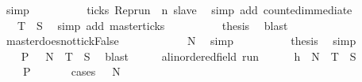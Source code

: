 \begin{isabellebody}
\ simp\isanewline
\ \ \ \ \ \ \ \ \isamarkupfalse%
\ {\isacartoucheopen}ticks\ {\isacharparenleft}Rep{\isacharunderscore}run\ {\isasymrho}\ n\ slave{\isacharparenright}{\isacartoucheclose}\ \isamarkupfalse%
\ {\isacharparenleft}simp\ add{\isacharcolon}\ counted{\isacharunderscore}immediate{\isacharparenright}\isanewline
\ \ \ \ \ \ \ \ \isamarkupfalse%
\ {\isacartoucheopen}{\isasymrho}\ {\isasymin}\ {\isacharquery}T\ {\isasyminter}\ {\isacharquery}S{\isacartoucheclose}\ \isamarkupfalse%
\ {\isacharparenleft}simp\ add{\isacharcolon}\ master{\isacharunderscore}ticks{\isacharparenright}\isanewline
\ \ \ \ \ \ \ \ \isamarkupfalse%
\ {\isacharquery}thesis\ \isamarkupfalse%
\ blast\isanewline
\ \ \ \ \isamarkupfalse%
\isanewline
\ \ \ \ \ \ \isamarkupfalse%
\ master{\isacharunderscore}doesnot{\isacharunderscore}tick{\isacharcolon}False\isanewline
\ \ \ \ \ \ \ \ \isamarkupfalse%
\ {\isacartoucheopen}{\isasymrho}\ {\isasymin}\ {\isacharquery}N{\isacartoucheclose}\ \isamarkupfalse%
\ simp\isanewline
\ \ \ \ \ \ \ \ \isamarkupfalse%
\ {\isacharquery}thesis\ \isamarkupfalse%
\ simp\isanewline
\ \ \ \ \isamarkupfalse%
\isanewline
\ \ \isacommand{{\isacharbraceright}}\isamarkupfalse%
\ \isamarkupfalse%
\ {\isacartoucheopen}{\isacharbraceleft}{\isasymrho}{\isachardot}\ {\isacharquery}P\ {\isasymrho}{\isacharbraceright}\ {\isasymsubseteq}\ {\isacharquery}N\ {\isasymunion}\ {\isacharquery}T\ {\isasyminter}\ {\isacharquery}S{\isacartoucheclose}\ \isamarkupfalse%
\ blast\isanewline
\ \ \isacommand{{\isacharbraceleft}}\isamarkupfalse%
\ \isamarkupfalse%
\ {\isasymrho}{\isacharcolon}{\isacharcolon}{\isacartoucheopen}{\isacharparenleft}{\isacharprime}a{\isacharcolon}{\isacharcolon}linordered{\isacharunderscore}field{\isacharparenright}\ run{\isacartoucheclose}\isanewline
\ \ \ \ \isamarkupfalse%
\ h{\isacharcolon}{\isacartoucheopen}{\isasymrho}\ {\isasymin}\ {\isacharquery}N\ {\isasymunion}\ {\isacharquery}T\ {\isasyminter}\ {\isacharquery}S{\isacartoucheclose}\isanewline
\ \ \ \ \isamarkupfalse%
\ {\isacartoucheopen}{\isasymrho}\ {\isasymin}\ {\isacharbraceleft}{\isasymrho}{\isachardot}\ {\isacharquery}P\ {\isasymrho}{\isacharbraceright}{\isacartoucheclose}\isanewline
\ \ \ \ \isamarkupfalse%
\ {\isacharparenleft}cases\ {\isacartoucheopen}{\isasymrho}\ {\isasymin}\ {\isacharquery}N{\isacartoucheclose}{\isacharparenright}\isanewline

\end{isabellebody}
